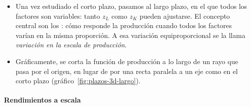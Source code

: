 \documentclass[11pt]{article}
\begin{document}
\begin{itemize}
\item Una vez estudiado el corto plazo, pasamos al largo plazo, en el que todos los factores son variables: tanto $z_L$ como $z_K$ pueden ajustarse. El concepto central son los : cómo responde la producción cuando todos los factores varían en la misma proporción. A esa variación equiproporcional se la llama \emph{variación en la escala de producción}.
\item Gráficamente, se corta la función de producción a lo largo de un rayo que pasa por el origen, en lugar de por una recta paralela a un eje como en el corto plazo (gráfico~\ref{fig:plazos-3d-largo}).
\end{itemize}

\paragraph{Rendimientos a escala}
\end{document}
